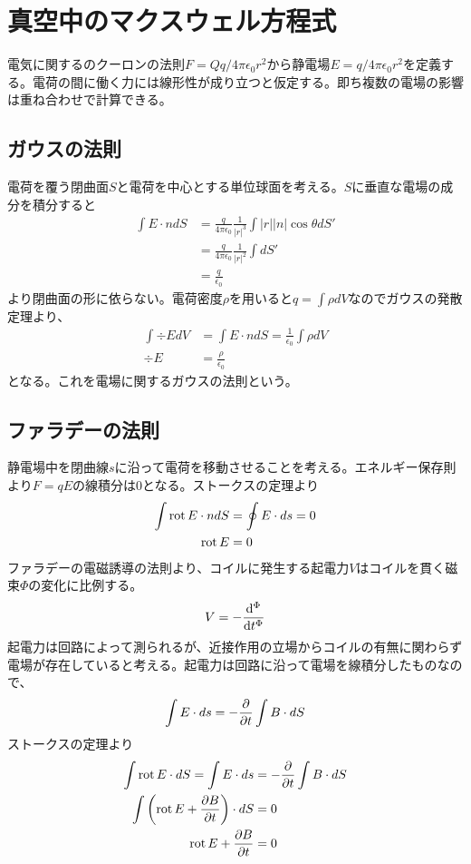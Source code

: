 \section{真空中のマクスウェル方程式}

電気に関するのクーロンの法則$F = Qq / 4\pi\epsilon_0r^2$から静電場$E = q / 4\pi\epsilon_0r^2$を定義する。電荷の間に働く力には線形性が成り立つと仮定する。即ち複数の電場の影響は重ね合わせで計算できる。

\subsection{ガウスの法則}
    電荷を覆う閉曲面$S$と電荷を中心とする単位球面を考える。$S$に垂直な電場の成分を積分すると
    \begin{align*}
        \int E \cdot n dS
            &= \frac{q}{4\pi\epsilon_0}\frac{1}{|r|^3}\int |r||n|\cos\theta dS'\\
            &= \frac{q}{4\pi\epsilon_0}\frac{1}{|r|^2}\int dS'\\
            &= \frac{q}{\epsilon_0}
    \end{align*}
    より閉曲面の形に依らない。電荷密度$\rho$を用いると$q = \int \rho dV$なのでガウスの発散定理より、
    \begin{align*}
        \int \div E dV &= \int E \cdot n dS = \frac{1}{\epsilon_0} \int \rho dV\\
        \div E &= \frac{\rho}{\epsilon_0}
    \end{align*}
    となる。これを電場に関するガウスの法則という。

\subsection{ファラデーの法則}
    静電場中を閉曲線$s$に沿って電荷を移動させることを考える。エネルギー保存則より$F = qE$の線積分は0となる。ストークスの定理より
    \begin{align*}
        \int \rot E \cdot ndS &= \oint E \cdot ds = 0\\
        \rot E &= 0
    \end{align*}
    ファラデーの電磁誘導の法則より、コイルに発生する起電力$V$はコイルを貫く磁束$\Phi$の変化に比例する。
        \[V = -\dv[\Phi]{t}\]
    起電力は回路によって測られるが、近接作用の立場からコイルの有無に関わらず電場が存在していると考える。起電力は回路に沿って電場を線積分したものなので、
        \[\int E \cdot ds = -\pd{t} \int B \cdot dS\]
    ストークスの定理より
    \begin{align*}
        \int \rot E \cdot dS = \int E \cdot ds &= -\pd{t} \int B \cdot dS\\
        \int \left(\rot E + \pd[B]{t}\right) \cdot dS &= 0\\
        \rot E + \pd[B]{t} &= 0
    \end{align*}

